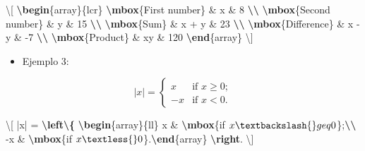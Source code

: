 \documentclass[12pt,a4paper,]{book}
\newenvironment{Shaded}{\begin{snugshade}}{\end{snugshade}}
\newcommand{\ExtensionTok}[1]{#1}
\newcommand{\KeywordTok}[1]{\textcolor[rgb]{0.13,0.29,0.53}{\textbf{#1}}}
\newcommand{\NormalTok}[1]{#1}
\newcommand{\SpecialCharTok}[1]{\textcolor[rgb]{0.81,0.36,0.00}{\textbf{#1}}}
\newcommand{\SpecialStringTok}[1]{\textcolor[rgb]{0.31,0.60,0.02}{#1}}
\providecommand{\tightlist}{%
  \setlength{\itemsep}{0pt}\setlength{\parskip}{0pt}}
\numberwithin{dummy}{section}
\theoremstyle{ocrenumbox}
\theoremstyle{blacknumex}
\theoremstyle{blacknumbox}
\theoremstyle{ocrenum}
\theoremstyle{ocrenum}
\begin{document}
\begin{Shaded}
\begin{Highlighting}[]
\SpecialStringTok{\textbackslash{}[ }
\KeywordTok{\textbackslash{}begin}\NormalTok{\{}\ExtensionTok{array}\NormalTok{\}}\SpecialStringTok{\{lcr\}}
\SpecialCharTok{\textbackslash{}mbox}\NormalTok{\{First number\}}\SpecialStringTok{ \& x \& 8 }\SpecialCharTok{\textbackslash{}\textbackslash{}}
\SpecialCharTok{\textbackslash{}mbox}\NormalTok{\{Second number\}}\SpecialStringTok{ \& y \& 15 }\SpecialCharTok{\textbackslash{}\textbackslash{}}
\SpecialCharTok{\textbackslash{}mbox}\NormalTok{\{Sum\}}\SpecialStringTok{ \& x + y \& 23 }\SpecialCharTok{\textbackslash{}\textbackslash{}}
\SpecialCharTok{\textbackslash{}mbox}\NormalTok{\{Difference\}}\SpecialStringTok{ \& x {-} y \& {-}7 }\SpecialCharTok{\textbackslash{}\textbackslash{}}
\SpecialCharTok{\textbackslash{}mbox}\NormalTok{\{Product\}}\SpecialStringTok{ \& xy \& 120 }\KeywordTok{\textbackslash{}end}\NormalTok{\{}\ExtensionTok{array}\NormalTok{\}}
\SpecialStringTok{\textbackslash{}]} 
\end{Highlighting}
\end{Shaded}

\begin{itemize}
\tightlist
\item
  Ejemplo 3:
\end{itemize}

\[ |x| = \left\{ \begin{array}{ll}
         x & \mbox{if $x \geq 0$};\\
        -x & \mbox{if $x < 0$}.\end{array} \right. \]

\begin{Shaded}
\begin{Highlighting}[]
\SpecialStringTok{\textbackslash{}[ |x| = }\SpecialCharTok{\textbackslash{}left\textbackslash{}\{}\SpecialStringTok{ }\KeywordTok{\textbackslash{}begin}\NormalTok{\{}\ExtensionTok{array}\NormalTok{\}}\SpecialStringTok{\{ll\}}
\SpecialStringTok{         x \& }\SpecialCharTok{\textbackslash{}mbox}\NormalTok{\{if }\SpecialStringTok{$x \textbackslash{}geq 0$}\NormalTok{\}}\SpecialStringTok{;}\SpecialCharTok{\textbackslash{}\textbackslash{}}
\SpecialStringTok{        {-}x \& }\SpecialCharTok{\textbackslash{}mbox}\NormalTok{\{if }\SpecialStringTok{$x \textless{} 0$}\NormalTok{\}}\SpecialStringTok{.}\KeywordTok{\textbackslash{}end}\NormalTok{\{}\ExtensionTok{array}\NormalTok{\}}\SpecialStringTok{ }\SpecialCharTok{\textbackslash{}right}\SpecialStringTok{. \textbackslash{}]} 
\end{Highlighting}
\end{Shaded}
\end{document}

